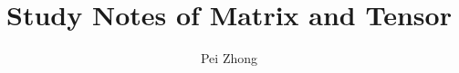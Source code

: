 \documentclass[12pt,oneside]{book} %
\begin{document}
\title{\bf \huge Study Notes of Matrix and Tensor}
\author{Pei Zhong}

\maketitle


\tableofcontents

\begin{spacing}{1}




















% 

% 

% 

% 




\end{spacing}
\end{document}

